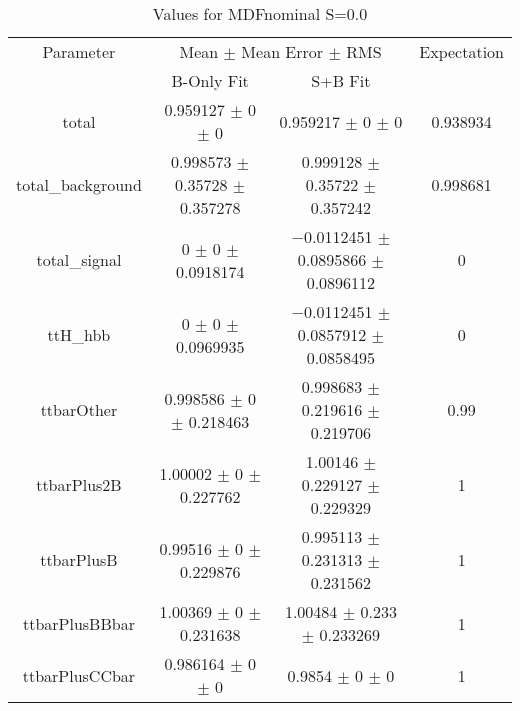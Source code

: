 \begin{table}
\centering
\caption{Values for MDFnominal S=0.0}
\begin{tabular}{cccc}
\toprule
Parameter & \multicolumn{2}{c}{Mean $\pm$ Mean Error $\pm$ RMS} & Expectation\\
 & B-Only Fit & S+B Fit & \\
\midrule
total & \num{0.959127} $\pm$ \num{0} $\pm$ \num{0} & \num{0.959217} $\pm$ \num{0} $\pm$ \num{0} & \num{0.938934}\\
total\_background & \num{0.998573} $\pm$ \num{0.35728} $\pm$ \num{0.357278} & \num{0.999128} $\pm$ \num{0.35722} $\pm$ \num{0.357242} & \num{0.998681}\\
total\_signal & \num{0} $\pm$ \num{0} $\pm$ \num{0.0918174} & \num{-0.0112451} $\pm$ \num{0.0895866} $\pm$ \num{0.0896112} & \num{0}\\
ttH\_hbb & \num{0} $\pm$ \num{0} $\pm$ \num{0.0969935} & \num{-0.0112451} $\pm$ \num{0.0857912} $\pm$ \num{0.0858495} & \num{0}\\
ttbarOther & \num{0.998586} $\pm$ \num{0} $\pm$ \num{0.218463} & \num{0.998683} $\pm$ \num{0.219616} $\pm$ \num{0.219706} & \num{0.99}\\
ttbarPlus2B & \num{1.00002} $\pm$ \num{0} $\pm$ \num{0.227762} & \num{1.00146} $\pm$ \num{0.229127} $\pm$ \num{0.229329} & \num{1}\\
ttbarPlusB & \num{0.99516} $\pm$ \num{0} $\pm$ \num{0.229876} & \num{0.995113} $\pm$ \num{0.231313} $\pm$ \num{0.231562} & \num{1}\\
ttbarPlusBBbar & \num{1.00369} $\pm$ \num{0} $\pm$ \num{0.231638} & \num{1.00484} $\pm$ \num{0.233} $\pm$ \num{0.233269} & \num{1}\\
ttbarPlusCCbar & \num{0.986164} $\pm$ \num{0} $\pm$ \num{0} & \num{0.9854} $\pm$ \num{0} $\pm$ \num{0} & \num{1}\\
\bottomrule
\end{tabular}
\end{table}